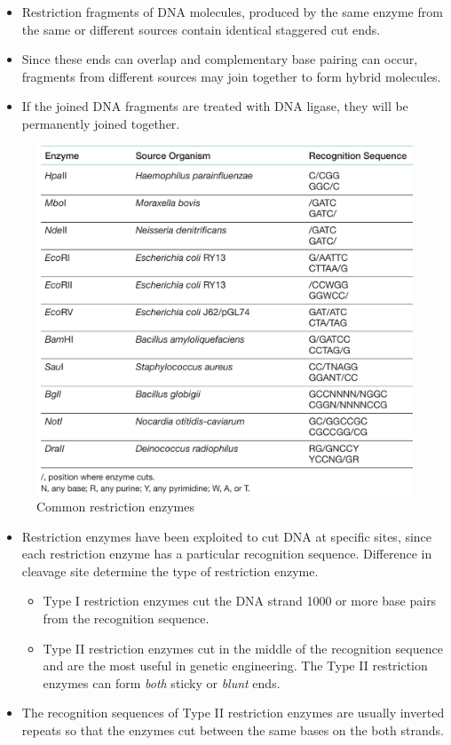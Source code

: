 \documentclass[11pt,dvipsnames,ignorenonframetext,aspectratio=169]{beamer}
\providecommand{\tightlist}{%
  \setlength{\itemsep}{0pt}\setlength{\parskip}{0pt}}
\begin{document}
\begin{frame}{}
\protect\hypertarget{section-13}{}
\begin{itemize}
\tightlist
\item
  Restriction fragments of DNA molecules, produced by the same enzyme
  from the same or different sources contain identical staggered cut
  ends.
\item
  Since these ends can overlap and complementary base pairing can occur,
  fragments from different sources may join together to form hybrid
  molecules.
\item
  If the joined DNA fragments are treated with DNA ligase, they will be
  permanently joined together.
\end{itemize}
\end{frame}

\begin{frame}{}
\protect\hypertarget{section-14}{}
\begin{figure}
\includegraphics[width=0.54\linewidth]{./../images/restriction_enzymes_ex} \caption{Common restriction enzymes}\label{fig:restriction-enzymes-ex}
\end{figure}
\end{frame}

\begin{frame}{}
\protect\hypertarget{section-15}{}
\begin{itemize}
\item
  Restriction enzymes have been exploited to cut DNA at specific sites,
  since each restriction enzyme has a particular recognition sequence.
  Difference in cleavage site determine the type of restriction enzyme.

  \begin{itemize}
  \tightlist
  \item
    Type I restriction enzymes cut the DNA strand 1000 or more base
    pairs from the recognition sequence.
  \item
    Type II restriction enzymes cut in the middle of the recognition
    sequence and are the most useful in genetic engineering. The Type II
    restriction enzymes can form \emph{both} sticky or \emph{blunt}
    ends.
  \end{itemize}
\item
  The recognition sequences of Type II restriction enzymes are usually
  inverted repeats so that the enzymes cut between the same bases on the
  both strands.
\end{itemize}
\end{frame}
\end{document}
